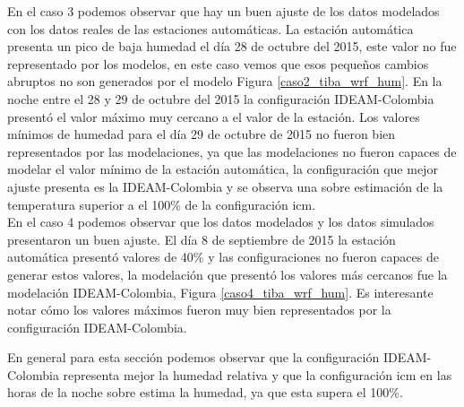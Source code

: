 En el caso 3 podemos observar que hay un buen ajuste de los datos modelados con los datos reales de las estaciones automáticas. La estación automática presenta un pico de baja humedad el día 28 de octubre del 2015, este valor no fue representado por los modelos, en este caso vemos que esos pequeños cambios abruptos no son generados por el modelo Figura \ref{caso2_tiba_wrf_hum}. En la noche entre el 28 y 29 de octubre del 2015 la configuración IDEAM-Colombia presentó el valor máximo muy cercano a el valor de la estación. Los valores mínimos de humedad para el día 29 de octubre de 2015 no fueron bien representados por las modelaciones, ya que las modelaciones no fueron capaces de modelar el valor mínimo de la estación automática, la configuración que mejor ajuste presenta es la IDEAM-Colombia y se observa una sobre estimación de la temperatura superior a el 100\% de la configuración icm.\\

En el caso 4 podemos observar que los datos modelados y los datos simulados presentaron un buen ajuste. El día 8 de septiembre de 2015 la estación automática presentó valores de 40\% y las configuraciones no fueron capaces de generar estos valores, la modelación que presentó los valores más cercanos fue la modelación IDEAM-Colombia, Figura \ref{caso4_tiba_wrf_hum}. Es interesante notar cómo los valores máximos fueron muy bien representados por la configuración IDEAM-Colombia.

En general para esta sección podemos observar que la configuración IDEAM-Colombia representa mejor la humedad relativa y que la configuración icm en las horas de la noche sobre estima la humedad, ya que esta supera el 100\%.


